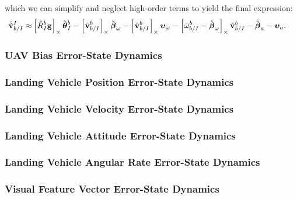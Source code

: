 which we can simplify and neglect high-order terms to yield the final
expression:
\begin{align}
  \dot{\tilde{\boldsymbol{\mathrm{v}}}}_{b/I}^I
  \approx&
  \left[  \hat{R}_I^b \boldsymbol{\mathrm{g}}  \right]_{\times} \tilde{\boldsymbol{\mathrm{\theta}}}_I^b 
  -
  \left[  \hat{\boldsymbol{\mathrm{v}}}_{b/I}^b  \right]_{\times} \tilde{\boldsymbol{\mathrm{\beta}}}_\omega
  -
  \left[  \hat{\boldsymbol{\mathrm{v}}}_{b/I}^b  \right]_{\times} \boldsymbol{\mathrm{\upsilon}}_\omega
  -
  \left[  \bar{\omega}_{b/I}^b - \hat{\boldsymbol{\mathrm{\beta}}}_\omega  \right]_{\times}
  \tilde{\boldsymbol{\mathrm{v}}}_{b/I}^b
  -
  \tilde{\boldsymbol{\mathrm{\beta}}}_a
  -
  \boldsymbol{\mathrm{\upsilon}}_a.
\end{align}

\subsubsection{UAV Bias Error-State Dynamics}
\subsubsection{Landing Vehicle Position Error-State Dynamics}
\subsubsection{Landing Vehicle Velocity Error-State Dynamics}
\subsubsection{Landing Vehicle Attitude Error-State Dynamics}
\subsubsection{Landing Vehicle Angular Rate Error-State Dynamics}
\subsubsection{Visual Feature Vector Error-State Dynamics}

